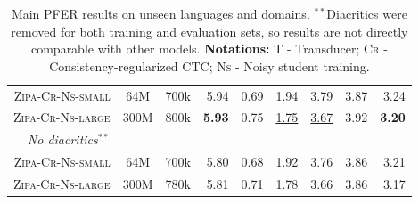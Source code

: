 \documentclass[11pt]{article}
\begin{document}
\begin{table}[]
{\begin{tabular}{@{\extracolsep{4pt}}rcrrrrrrr}
\textsc{Zipa-Cr-Ns-small}     &     64M       &    700k       &    \underline{5.94}       &   0.69  &   1.94 & 3.79 & \underline{3.87}  & \underline{3.24}   \\
\textsc{Zipa-Cr-Ns-large}     &     300M       &   800k        &  \textbf{5.93} & 0.75 &  \underline{1.75} & \underline{3.67} & 3.92  & \textbf{3.20} \\ \midrule
\textit{No diacritics$^{**}$} \\\midrule
\textsc{Zipa-Cr-Ns-small}     &     64M       &    700k       &   5.80       &   0.68  &   1.92 & 3.76 & 3.86  & 3.21   \\
\textsc{Zipa-Cr-Ns-large}     &     300M       &   780k        &  5.81 & 0.71 &  1.78 & 3.66 & 3.86  & 3.17 \\ 
\bottomrule       
\end{tabular}
}
\caption{Main PFER results on unseen languages and domains. $^{**}$Diacritics were removed for both training and evaluation sets, so results are not directly comparable with other models. \textbf{Notations:} \textsc{T} - Transducer; \textsc{Cr} - Consistency-regularized CTC; \textsc{Ns} - Noisy student training.}
\label{tab:unseen}
\end{table}
\end{document}
